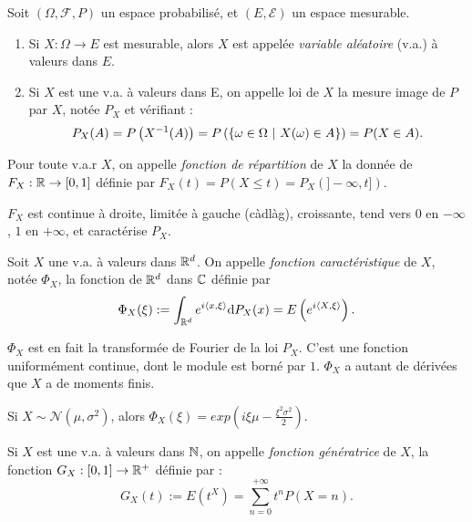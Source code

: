 \documentclass[11pt,a4paper]{article}
\begin{document}
\begin{definstar} Soit  $(\Omega, \mathcal{F}, P)$ un espace probabilisé, et $(E,\mathcal{E})$ un espace mesurable.
\begin{enumerate}
\item Si $X: \Omega \to E$ est mesurable, alors $X$ est appelée \textit{variable aléatoire} (v.a.) à valeurs dans $E$.
\item Si $X$ est une v.a. à valeurs dans E, on appelle loi de $X$ la mesure image de $P$ par $X$, notée $P_X$ et vérifiant : 
\[P_X(A) = P\left(X^{-1}(A)\right)=P\left(\left\{ \omega\in \Omega \ \middle| \  X(\omega)\in A \right\}\right) =P(X\in A).\]
\end{enumerate}
\end{definstar}

\begin{definstar}
Pour toute v.a.r $X$, on appelle \textit{fonction de répartition} de $X$ la donnée de $F_X :\mathbb R \to [0,1]$ définie par $F_X(t) = P(X\leq t) = P_X(]-\infty,t])$.
\end{definstar}

\begin{rmq}
$F_X$ est continue à droite, limitée à gauche (càdlàg), croissante, tend vers $0$ en $-\infty$, $1$ en $+\infty$, et caractérise $P_X$.
\end{rmq}

\begin{definstar}
Soit $X$ une v.a. à valeurs dans $\mathbb R^d$. On appelle \textit{fonction caractéristique} de $X$, notée $\Phi_X$, la fonction de $\mathbb R^d$ dans $\mathbb C$ définie par \[\Phi_X(\xi) := \int_{\mathbb R^d} e^{i\left<x,\xi\right>}\mathrm{d}P_X(x) = E\left(e^{i\left<X,\xi\right>}\right).\]
\end{definstar}

\begin{rmq}
$\Phi_X$ est en fait la transformée de Fourier de la loi $P_X$. C'est une fonction uniformément continue, dont le module est borné par $1$. $\Phi_X$ a autant de dérivées que $X$ a de moments finis.
\end{rmq}

\begin{rmq}
Si $X\sim \mathcal{N}(\mu,\sigma^2)$, alors $\Phi_X(\xi)=exp(i\xi\mu - \frac{\xi^2\sigma^2}{2})$.
\end{rmq}

\begin{definstar}
Si $X$ est une v.a. à valeurs dans $\mathbb N$, on appelle \textit{fonction génératrice} de $X$, la fonction $G_X : [0,1] \to \mathbb R^+$ définie par : \[G_X(t) := E(t^X) = \sum_{n=0}^{+\infty} t^nP(X=n).\]
\end{definstar}
\end{document}
